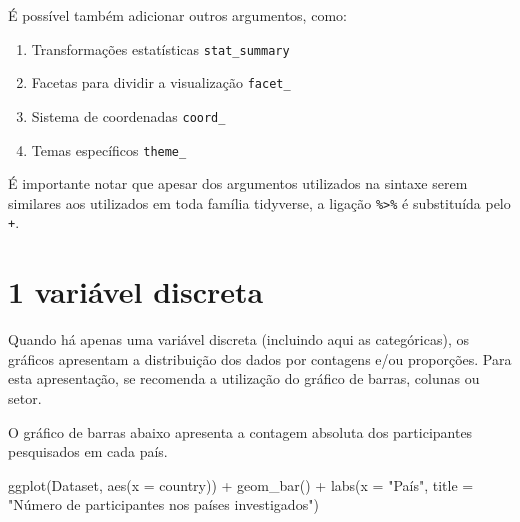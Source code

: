 \documentclass[
]{book}
\newenvironment{Shaded}{\begin{snugshade}}{\end{snugshade}}
\newcommand{\AttributeTok}[1]{\textcolor[rgb]{0.77,0.63,0.00}{#1}}
\newcommand{\FunctionTok}[1]{\textcolor[rgb]{0.00,0.00,0.00}{#1}}
\newcommand{\NormalTok}[1]{#1}
\newcommand{\SpecialCharTok}[1]{\textcolor[rgb]{0.00,0.00,0.00}{#1}}
\newcommand{\StringTok}[1]{\textcolor[rgb]{0.31,0.60,0.02}{#1}}
\providecommand{\tightlist}{%
  \setlength{\itemsep}{0pt}\setlength{\parskip}{0pt}}
\begin{document}
É possível também adicionar outros argumentos, como:

\begin{enumerate}
\def\labelenumi{\arabic{enumi}.}
\setcounter{enumi}{3}
\tightlist
\item
  Transformações estatísticas \texttt{stat\_summary}\\
\item
  Facetas para dividir a visualização \texttt{facet\_}\\
\item
  Sistema de coordenadas \texttt{coord\_}\\
\item
  Temas específicos \texttt{theme\_}
\end{enumerate}

É importante notar que apesar dos argumentos utilizados na sintaxe serem similares aos utilizados em toda família tidyverse, a ligação \texttt{\%\textgreater{}\%} é substituída pelo \texttt{+}.

\hypertarget{variuxe1vel-discreta}{%
\section{1 variável discreta}\label{variuxe1vel-discreta}}

Quando há apenas uma variável discreta (incluindo aqui as categóricas), os gráficos apresentam a distribuição dos dados por contagens e/ou proporções. Para esta apresentação, se recomenda a utilização do gráfico de barras, colunas ou setor.

O gráfico de barras abaixo apresenta a contagem absoluta dos participantes pesquisados em cada país.

\begin{Shaded}
\begin{Highlighting}[]
\FunctionTok{ggplot}\NormalTok{(Dataset, }\FunctionTok{aes}\NormalTok{(}\AttributeTok{x =}\NormalTok{ country)) }\SpecialCharTok{+}
  \FunctionTok{geom\_bar}\NormalTok{() }\SpecialCharTok{+}
  \FunctionTok{labs}\NormalTok{(}\AttributeTok{x =} \StringTok{"País"}\NormalTok{, }
       \AttributeTok{title =} \StringTok{"Número de participantes nos países investigados"}\NormalTok{)}
\end{Highlighting}
\end{Shaded}
\end{document}
